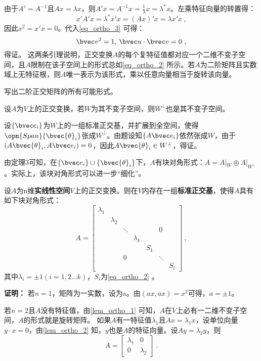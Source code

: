 由于$A'=A^{-1}$且$Ax=\lambda x$，则$A'x=A^{-1}x=\frac{1}{\lambda}x=\lambda^* x$。左乘特征向量的转置得：
\begin{equation}
x'A'x=\lambda^* x'x=(Ax)'x=\lambda x'x~,
\end{equation}
因此$x^2=x'x=0$。代入\autoref{eq_ortho_3} 可得：
\begin{equation}
\bvec v^2=1,\,\bvec u\cdot \bvec v=0~,
\end{equation}
得证。
这两条引理说明，正交变换$A$的每个复特征值都对应一个二维不变子空间，且$A$限制在该子空间上的形式总如\autoref{eq_ortho_2} 所示。若$A$为二阶矩阵且实数域上无特征根，则$A$唯一表示为该形式，乘以任意向量相当于旋转该向量。
\begin{exercise}{}
写出二阶正交矩阵的所有可能形式。
\end{exercise}
\begin{lemma}{}\label{lem_ortho_2}
设$A$为$V$上的正交变换，若$W$为其不变子空间，则$W^{\bot}$也是其不变子空间。
\end{lemma}
设$\{\bvec e_i\}$为$W$上的一组标准正交基，并扩展到全空间，使得$\opn{Span}\{\bvec {\theta}_i\}$张成$W^{\bot}$。由题设知$\{A\bvec e_i\}$依然张成$W$，由于$(A\bvec {\theta}_i,A\bvec e_i)=0$，因此$A\bvec{\theta}_i\in W^{\bot}$，得证。

由定理3可知，在$\{\bvec e_i\}\cup\{\bvec {\theta}_i\}$下，$A$有块对角形式：$A=A|_W\oplus A|_{W^{\bot}}$。实际上，该块对角形式可以进一步“细化”。
\begin{theorem}{}
设$A$为n维\textbf{实线性空间}$V$上的正交变换。则在$V$内存在一组\textbf{标准正交基}，使得$A$具有如下块对角形式：
\begin{equation}
A=\left[\begin{array}{lllllll}
\lambda_1 & & & & & & \\
& \lambda_2 & & & & & \\
& & \ddots & & & 0 & \\
& & & \lambda_k & & & \\
& & & & S_1 & & \\
& & 0 & & & \ddots & \\
& & & & & & S_l
\end{array}\right]~,
\end{equation}
其中$\lambda_i=\pm 1(i=1,2...k)$，$S_i$为\autoref{eq_ortho_2} 。
\end{theorem}
\textbf{证明：}
若$n=1$，矩阵为一实数，设为a。由$(ax,ax)=x^2$可得，$a=\pm 1$。

若$n=2$且$A$没有特征值，由\autoref{lem_ortho_1} 可知，$A$在$V$上必有一二维不变子空间，$A$的形式就是旋转矩阵。
如果$A$有一特征值$\lambda_1$且$Ax=\lambda_1 x$，设单位向量$y\cdot x=0$，由\autoref{lem_ortho_2} 知，$y$也是$A$的特征向量。设$Ay=\lambda_2 y$，则
\begin{equation}
A=\left[\begin{array}{rr}
\lambda_1&0\\
0&\lambda_2
\end{array}
\right]~.
\end{equation}

